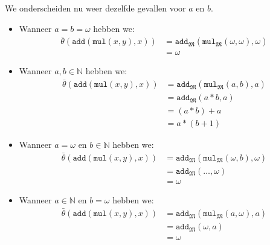 \documentclass[a4paper,11pt]{article}
\begin{document}
\begin{itemize}
We onderscheiden nu weer dezelfde gevallen voor $a$ en $b$.

\begin{itemize}

\item
Wanneer $a = b = \omega$ hebben we:
\begin{align*}
\bar \theta(\texttt{add}(\texttt{mul}(x,y),x)) &= \texttt{add}_{\mathfrak{M}}(\texttt{mul}_{\mathfrak{M}}(\omega,\omega),\omega) \\
                                               &= \omega
\end{align*}

\item
Wanneer $a,b \in \mathbb{N}$ hebben we:
\begin{align*}
\bar \theta(\texttt{add}(\texttt{mul}(x,y),x)) &= \texttt{add}_{\mathfrak{M}}(\texttt{mul}_{\mathfrak{M}}(a,b),a) \\
                                               &= \texttt{add}_{\mathfrak{M}}(a*b,a) \\
                                               &= (a*b)+a \\
                                               &= a*(b+1)
\end{align*}

\item
Wanneer $a = \omega$ en $b \in \mathbb{N}$ hebben we:
\begin{align*}
\bar \theta(\texttt{add}(\texttt{mul}(x,y),x)) &= \texttt{add}_{\mathfrak{M}}(\texttt{mul}_{\mathfrak{M}}(\omega,b),\omega) \\
                                               &= \texttt{add}_{\mathfrak{M}}(\ldots,\omega) \\
                                               &= \omega
\end{align*}

\item
Wanneer $a \in \mathbb{N}$ en $b = \omega$ hebben we:
\begin{align*}
\bar \theta(\texttt{add}(\texttt{mul}(x,y),x)) &= \texttt{add}_{\mathfrak{M}}(\texttt{mul}_{\mathfrak{M}}(a,\omega),a) \\
                                               &= \texttt{add}_{\mathfrak{M}}(\omega,a) \\
                                               &= \omega
\end{align*}

\end{itemize}


\end{itemize}
\end{document}
